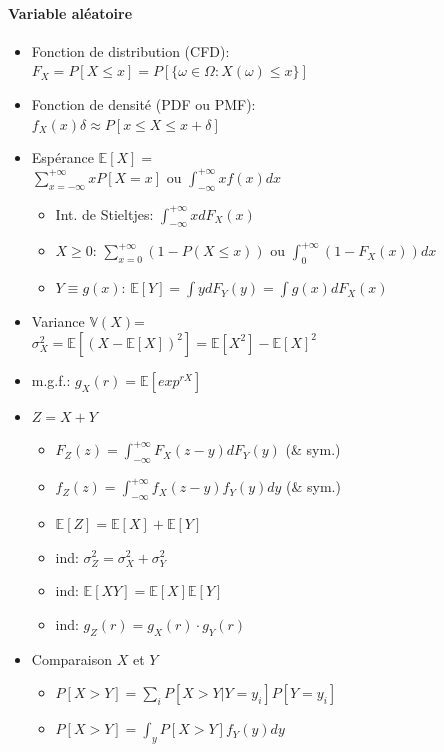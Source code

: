 \documentclass[paper=a4,fontsize=8pt,pagesize,DIV=calc]{scrartcl}
\begin{document}
\begin{multicols}{3}
\paragraph{Variable aléatoire}
\begin{itemize}
\item Fonction de distribution (CFD): \\$F_X=P[X\leq x]=P[\{\omega \in \Omega:X(\omega)\leq x\}]$
\item Fonction de densité (PDF ou PMF):\\ $f_X(x)\delta \approx P[x \leq X \leq x + \delta]$
\item Espérance $\mathbb{E}[X]=$ \\ $ \sum_{x=-\infty}^{+\infty} xP[X=x]$ ou $\int^{+\infty}_{-\infty}xf(x)dx$
\begin{itemize}
\item Int. de Stieltjes: $\int^{+\infty}_{-\infty}xdF_X(x)$
\item $X\geq 0$: $\sum_{x=0}^{+\infty} (1-P(X\leq x))$ ou $\int^{+\infty}_{0}(1-F_X(x))dx$
\item $Y \equiv g(x)$: $\mathbb{E}[Y]= \int ydF_Y(y)=\int g(x)dF_X(x)$
\end{itemize}
\item Variance $\mathbb{V}(X)$=\\
$\sigma^2_X=\mathbb{E}[(X-\mathbb{E}[X])^2]=\mathbb{E}[X^2]-\mathbb{E}[X]^2$
\item m.g.f.: $g_X(r)=\mathbb{E}[exp^{rX}]$
\item $Z = X + Y$
\begin{itemize}
\item $F_Z(z) = \int_{-\infty}^{+\infty}F_X(z- y)dF_Y (y)$ (\& sym.)
\item $f_Z(z) = \int_{-\infty}^{+\infty}f_X(z- y)f_Y (y)dy $ (\& sym.)
\item $\mathbb{E}[Z]=\mathbb{E}[X]+\mathbb{E}[Y]$
\item ind: $\sigma_Z^2=\sigma_X^2+\sigma_Y^2$
\item ind: $\mathbb{E}[XY]=\mathbb{E}[X]\mathbb{E}[Y]$
\item ind: $g_Z(r)=g_X(r)\cdot g_Y(r)$
\end{itemize}
\item Comparaison $X$ et $Y$
\begin{itemize}
\item $P[X>Y]=\sum_i P[X>Y|Y=y_i]P[Y=y_i]$
\item $P[X>Y]=\int_y P[X>Y] f_Y(y) dy$
\end{itemize}
\end{itemize}

\end{multicols}
\end{document}
